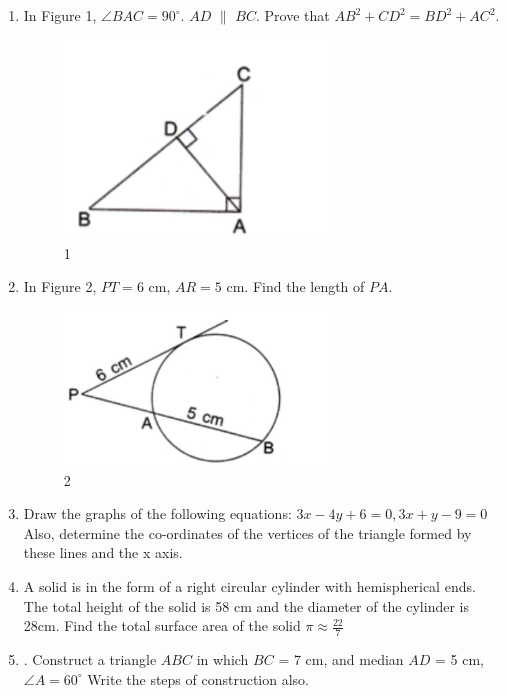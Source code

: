 \begin{enumerate}
\item In Figure 1, $\angle BAC = 90^\circ$. $AD$ $\parallel$ $BC$. Prove that $AB^2 + CD^2 = BD^2 + AC^2$.
        \begin{figure}[h]
        \centering
                \includegraphics[width=70mm]{figs/IMG01.PNG}
                \caption{1}                                                                                               \label{fig}                   
         \end{figure}
\item  In Figure 2, $PT = 6 \text{ cm}$, $AR = 5 \text{ cm}$. Find the length of $PA$.

\begin{figure}[h]
        \centering
                \includegraphics[width=70mm]{figs/IMG02.PNG}
                \caption{2}
                \label{fig:}
\end{figure}

                                                             \item Draw the graphs of the following equations:
$3x - 4y + 6 = 0 ,3x + y - 9 = 0$
Also, determine the co-ordinates of the vertices of the triangle formed by these lines and the x
axis.
\item  A solid is in the form of a right circular cylinder with hemispherical ends. The total height
of the solid is 58 cm and the diameter of the cylinder is 28cm. Find the total surface area of the
   solid  $\pi \approx \frac{22}{7} $

\item . Construct a triangle $ABC$ in which $BC$ = 7 cm, and median $AD$ = 5 cm, $\angle A=60^\circ$ Write      the steps of construction also.


\end{enumerate}
